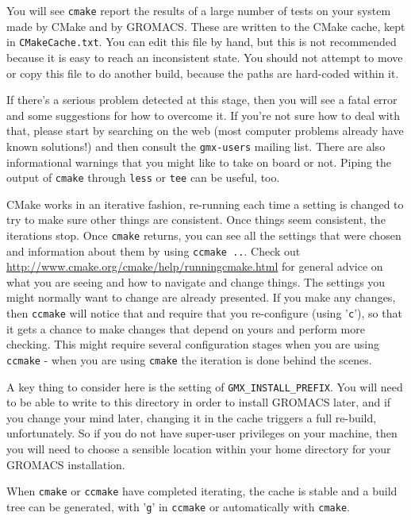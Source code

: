 \documentclass{article}[12pt,a4paper,twoside]
\newcommand{\gromacs}{GROMACS}
\newcommand{\cmake}{CMake}
\begin{document}
You will see \texttt{cmake} report the results of a large number of tests on
your system made by \cmake{} and by \gromacs{}. These are written to
the \cmake{} cache, kept in \texttt{CMakeCache.txt}. You can edit this
file by hand, but this is not recommended because it is easy to reach
an inconsistent state. You should not attempt to move or copy this
file to do another build, because the paths are hard-coded within it.

If there's a serious problem detected at this stage, then you will see
a fatal error and some suggestions for how to overcome it. If you're
not sure how to deal with that, please start by searching on the web
(most computer problems already have known solutions!) and then
consult the \texttt{gmx-users} mailing list. There are also
informational warnings that you might like to take on board or
not. Piping the output of \texttt{cmake} through \texttt{less} or
\texttt{tee} can be useful, too.

\cmake{} works in an iterative fashion, re-running each time a setting
is changed to try to make sure other things are consistent. Once
things seem consistent, the iterations stop. Once \texttt{cmake}
returns, you can see all the settings that were chosen and information
about them by using \verb+ccmake ..+. Check out
\url{http://www.cmake.org/cmake/help/runningcmake.html} for general
advice on what you are seeing and how to navigate and change
things. The settings you might normally want to change are already
presented. If you make any changes, then \texttt{ccmake} will notice
that and require that you re-configure (using '\verb+c+'), so that it
gets a chance to make changes that depend on yours and perform more
checking. This might require several configuration stages when you are
using \texttt{ccmake} - when you are using \texttt{cmake} the
iteration is done behind the scenes.

A key thing to consider here is the setting of
\texttt{GMX\_INSTALL\_PREFIX}. You will need to be able to write to this
directory in order to install \gromacs{} later, and if you change your
mind later, changing it in the cache triggers a full re-build,
unfortunately. So if you do not have super-user privileges on your
machine, then you will need to choose a sensible location within your
home directory for your \gromacs{} installation.

When \texttt{cmake} or \texttt{ccmake} have completed iterating, the
cache is stable and a build tree can be generated, with '\verb+g+' in
\texttt{ccmake} or automatically with \texttt{cmake}.
\end{document}
